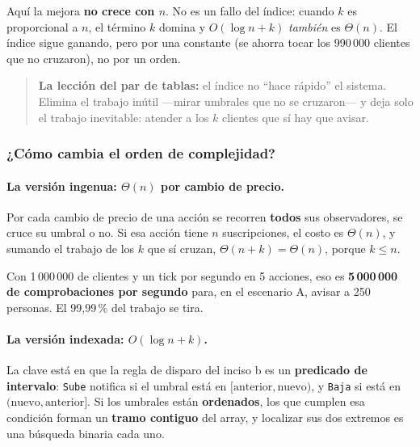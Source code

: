 Aquí la mejora \textbf{no crece con $n$}. No es un fallo del índice: cuando $k$ es
proporcional a $n$, el término $k$ domina y $O(\log n + k)$ \emph{también} es $\Theta(n)$. El
índice sigue ganando, pero por una constante (se ahorra tocar los 990\,000 clientes que no
cruzaron), no por un orden.

\begin{quote}
\textbf{La lección del par de tablas:} el índice no ``hace rápido'' el sistema. Elimina el
trabajo inútil ---mirar umbrales que no se cruzaron--- y deja solo el trabajo inevitable:
atender a los $k$ clientes que sí hay que avisar.
\end{quote}

\subsubsection{¿Cómo cambia el orden de complejidad?}

\paragraph{La versión ingenua: $\Theta(n)$ por cambio de precio.}
Por cada cambio de precio de una acción se recorren \textbf{todos} sus observadores, se cruce
su umbral o no. Si esa acción tiene $n$ suscripciones, el costo es $\Theta(n)$, y sumando el
trabajo de los $k$ que sí cruzan, $\Theta(n + k) = \Theta(n)$, porque $k \le n$.

Con 1\,000\,000 de clientes y un tick por segundo en 5 acciones, eso es \textbf{5\,000\,000
de comprobaciones por segundo} para, en el escenario A, avisar a 250 personas. El 99,99\,\%
del trabajo se tira.

\paragraph{La versión indexada: $O(\log n + k)$.}
La clave está en que la regla de disparo del inciso b es un \textbf{predicado de intervalo}:
\texttt{Sube} notifica si el umbral está en $[\text{anterior}, \text{nuevo})$, y
\texttt{Baja} si está en $(\text{nuevo}, \text{anterior}]$. Si los umbrales están
\textbf{ordenados}, los que cumplen esa condición forman un \textbf{tramo contiguo} del
array, y localizar sus dos extremos es una búsqueda binaria cada uno.

